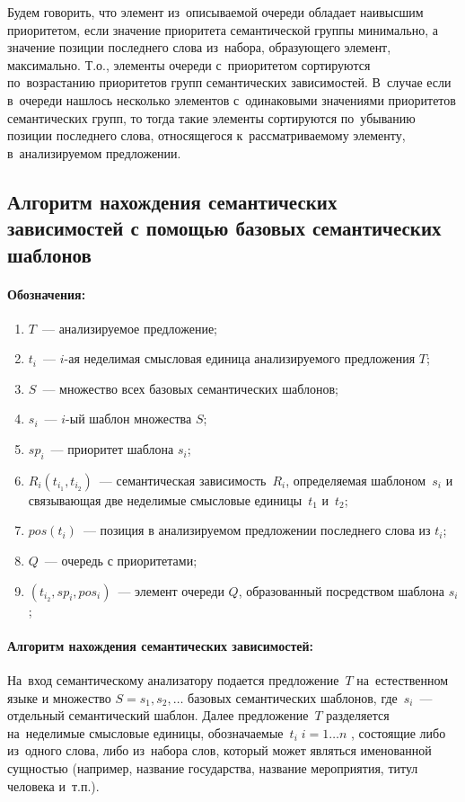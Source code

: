 \documentclass[12pt]{article}
\theoremstyle{definition}
\theoremstyle{remark}
\numberwithin{equation}{section}
\begin{document}
Будем говорить, что элемент из~описываемой очереди обладает
наивысшим приоритетом, если значение приоритета семантической
группы минимально, а значение позиции последнего слова из~набора,
образующего элемент, максимально. Т.о., элементы очереди с~приоритетом
сортируются по~возрастанию приоритетов групп семантических зависимостей.
В~случае если в~очереди нашлось несколько элементов с~одинаковыми
значениями приоритетов семантических групп, то тогда такие элементы
сортируются по~убыванию позиции последнего слова, относящегося
к~рассматриваемому элементу, в~анализируемом предложении.

\subsection{Алгоритм нахождения семантических зависимостей с помощью базовых семантических шаблонов}
\paragraph{Обозначения:}
\begin{enumerate}
    \item $T$~--- анализируемое предложение;
    \item $t_i$~--- $i$-ая неделимая смысловая единица
    анализируемого предложения $T$;
    \item $S$~--- множество всех базовых семантических
    шаблонов;
    \item $s_i$~--- $i$-ый шаблон множества $S$;
    \item $sp_i$~--- приоритет шаблона $s_i$;
    \item $R_i(t_{i_1},t_{i_2})$~--- семантическая зависимость~$R_i$,
    определяемая шаблоном~$s_i$ и связывающая две неделимые
    смысловые единицы~$t_1$ и~$t_2$;
    \item $pos(t_i)$~--- позиция в анализируемом предложении последнего слова из $t_i$;
    \item $Q$~--- очередь с приоритетами;
    \item $(t_{i_2}, sp_i, pos_i)$~--- элемент очереди $Q$, образованный
    посредством шаблона $s_i$;
\end{enumerate}
\paragraph{Алгоритм нахождения семантических зависимостей:}
На~вход семантическому анализатору подается предложение~$T$
на~естественном языке и множество $S={s_1,s_2,\dots}$ базовых
семантических шаблонов, где~$s_i$~--- отдельный семантический
шаблон. Далее предложение~$T$ разделяется на~неделимые
смысловые единицы, обозначаемые~$t_i\;i=1\dots n$ , состоящие
либо из~одного слова, либо из~набора слов, который может
являться именованной сущностью (например, название государства,
название мероприятия, титул человека и~т.п.).
\end{document}
